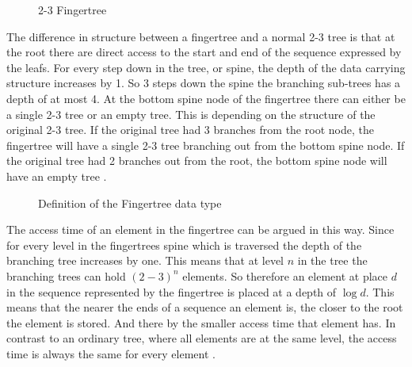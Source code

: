 \begin{figure}[!h]
\centering
{} 
\caption{2-3 Fingertree
\label{fig:fingertree}}
\end{figure}

The difference in structure between a fingertree and a normal 2-3 tree is that
at the root there are direct access to the start and end of the sequence
expressed by the leafs. For every step down in the tree, or spine, the depth
of the data carrying structure increases by 1. So 3 steps down the spine the
branching sub-trees has a depth of at most 4. At the bottom spine node of the
fingertree there can either be a single 2-3 tree or an empty tree. This is
depending on the structure of the original 2-3 tree. If the original tree had
3 branches from the root node, the fingertree will have a single 2-3 tree
branching out from the bottom spine node. If the original tree had 2 branches
out from the root, the bottom spine node will have an empty tree \cite{fingertree}.

\begin{figure}[h!]

\caption{Definition of the Fingertree data type \label{fig:DataTypeFingertree}}
\end{figure}

The access time of an element in the fingertree can be argued in this way.
Since for every level in the fingertrees spine which is traversed the depth
of the branching tree increases by one. This means that at level $n$ in the
tree the branching trees can hold $(2-3)^n$ elements. So therefore an element
at place $d$ in the sequence represented by the fingertree is placed at a
depth of $\log d$. This means that the nearer the ends of a sequence an
element is, the closer to the root the element is stored. And there by the
smaller access time that element has. In contrast to an ordinary tree, where
all elements are at the same level, the access time is always the same for
every element \cite{fingertree}. 

